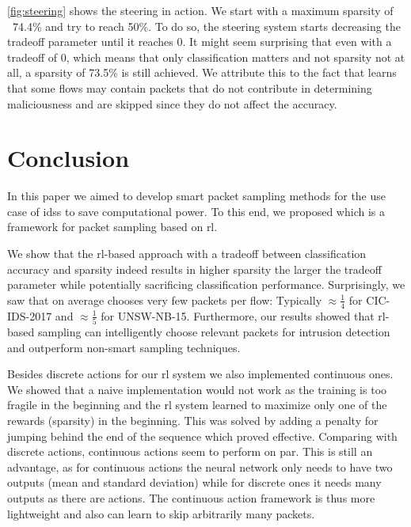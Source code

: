 \documentclass[conference]{IEEEtran}
\begin{document}
\autoref{fig:steering} shows the steering in action. We start with a maximum sparsity of ~74.4\% and try to reach 50\%. To do so, the steering system starts decreasing the tradeoff parameter until it reaches 0. It might seem surprising that even with a tradeoff of 0, which means that only classification matters and not sparsity not at all, a sparsity of 73.5\% is still achieved. We attribute this to the fact that \ours{} learns that some flows may contain packets that do not contribute in determining maliciousness and are skipped since they do not affect the accuracy. %


\section{Conclusion}
\label{sec:conclusion}
In this paper we aimed to develop smart packet sampling methods for the use case of \glspl{ids} to save computational power. To this end, we proposed \ours{} which is a framework for packet sampling based on \gls{rl}.

We show that the \gls{rl}-based approach with a tradeoff between classification accuracy and sparsity indeed results in higher sparsity the larger the tradeoff parameter while potentially sacrificing classification performance. Surprisingly, we saw that \ours{} on average chooses very few packets per flow: Typically $\approx \frac{1}{4}$ for CIC-IDS-2017 and $\approx \frac{1}{5}$ for UNSW-NB-15. Furthermore, our results showed that \gls{rl}-based sampling can intelligently choose relevant packets for intrusion detection and outperform non-smart sampling techniques.

Besides discrete actions for our \gls{rl} system we also implemented continuous ones. We showed that a naive implementation would not work as the training is too fragile in the beginning and the \gls{rl} system learned to maximize only one of the rewards (sparsity) in the beginning. This was solved by adding a penalty for jumping behind the end of the sequence which proved effective. Comparing with discrete actions, continuous actions seem to perform on par. This is still an advantage, as for continuous actions the neural network only needs to have two outputs (mean and standard deviation) while for discrete ones it needs many outputs as there are actions. The continuous action framework is thus more lightweight and also can learn to skip arbitrarily many packets.
\end{document}

